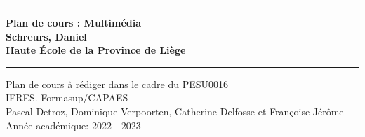 \newcommand{\JMUTitle}[9]{
    \thispagestyle{empty}
    \vspace*{\stretch{1}}
    {\parindent0cm
        \rule{\linewidth}{.7ex}}
    \begin{flushright}
        \vspace*{\stretch{1}}
        \bfseries\Huge
        #1\\
        \vspace*{\stretch{1}}
        \bfseries\large
        #4\\
        \vspace*{\stretch{1}}
        \bfseries\large
        #9
    \end{flushright}
    \rule{\linewidth}{.7ex}

    \vspace*{\stretch{1}}
    \begin{center}
        \vspace*{\stretch{1}}
        \Large #3 \\

        \vspace*{\stretch{2}}
        \large IFRES. Formasup/CAPAES\\
        \vspace*{\stretch{1}}
        \large   #8 \\[1mm]
        \large Année académique: #5 - #6
    \end{center}
}
\JMUTitle
{Plan de cours : Multimédia}                                %
{Kurztitel der Arbeit}                            %
{Plan de cours à rédiger dans le cadre du PESU0016}       %
{Schreurs, Daniel }                              %
{2022}                                      %
{2023}                                      %
{Bachelor/Master Wirtschaftsinformatik}           %
{Pascal Detroz, Dominique Verpoorten, Catherine Delfosse et Françoise Jérôme}                       %
{Haute École de la Province de Liège}                                        %
\clearpage